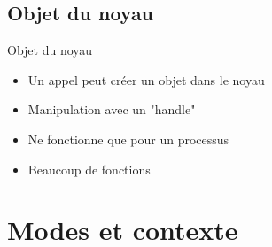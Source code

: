 \begin{frame}{\sectitle}
\def\subsectitle{Objet du noyau}
\subsection{\subsectitle}

\begin{block}{\subsectitle}
\begin{itemize}
    \item Un appel peut créer un objet dans le noyau
    \item Manipulation avec un "handle"
    \item Ne fonctionne que pour un processus
    \item Beaucoup de fonctions
\end{itemize}
\end{block}
\end{frame}

\def\sectitle{Modes et contexte}
\section{\sectitle}

